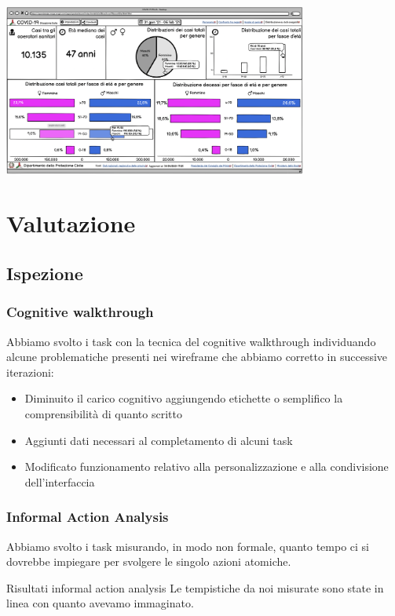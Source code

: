 \documentclass[handout]{beamer}
\begin{document}
		\begin{frame}
			\includegraphics[width=10cm]{img/distribuzione-dati-anagrafici}
		\end{frame}


	\section{Valutazione}
		\subsection{Ispezione}
		\begin{frame}
			\frametitle{Cognitive walkthrough}
			Abbiamo svolto i task con la tecnica del cognitive walkthrough individuando alcune problematiche presenti nei wireframe che abbiamo corretto in successive iterazioni:
			\begin{itemize}[<+->]
				\item Diminuito il carico cognitivo aggiungendo etichette o semplifico la comprensibilità di quanto scritto\\
				\item Aggiunti dati necessari al completamento di alcuni task\\
				\item Modificato funzionamento relativo alla personalizzazione e alla condivisione dell'interfaccia\\
			\end{itemize}
		\end{frame}

		\begin{frame}
			\frametitle{Informal Action Analysis}
			Abbiamo svolto i task misurando, in modo non formale, quanto tempo ci si dovrebbe impiegare per svolgere le singolo azioni atomiche. \newline \newline
			\begin{block}{Risultati informal action analysis}
			Le tempistiche da noi misurate sono state in linea con quanto avevamo immaginato.
		\end{block}
		\end{frame}
\end{document}
